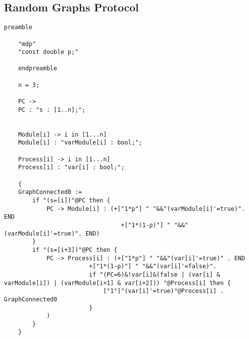 \subsection{Random Graphs Protocol}

\begin{lstlisting}[style=chor-color,caption={Choreographic language for the Random Graphs
	Protocol.},captionpos=b,label={ex4-code}]
	preamble

	"mdp"
	"const double p;"
	
	endpreamble
	
	n = 3;
	
	PC -> 
	PC : "s : [1..n];";
	
	
	Module[i] -> i in [1...n]
	Module[i] : "varModule[i] : bool;";
	
	Process[i] -> i in [1...n]
	Process[i] : "var[i] : bool;";
	
	{
	GraphConnected0 := 
		if "(s=[i])"@PC then {
			PC -> Module[i] : (+["1*p"] " "&&"(varModule[i]'=true)". END
								 +["1*(1-p)"] " "&&"(varModule[i]'=true)". END)
		}
		if "(s=[i+3])"@PC then {
			PC -> Process[i] : (+["1*p"] " "&&"(var[i]'=true)" . END
						+["1*(1-p)"] " "&&"(var[i]'=false)".
						if "(PC=6)&!var[i]&(false | (var[i] & varModule[i]) | (varModule[i+1] & var[i+2])) "@Process[i] then {
							["1"]"(var[i]'=true)"@Process[i] . GraphConnected0
						}	
			) 	
		}								  
	}
\end{lstlisting}

